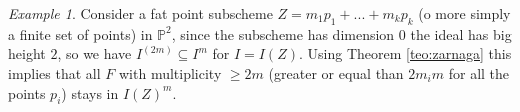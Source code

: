 \documentclass[a4wide]{book}
\theoremstyle{plain}
\theoremstyle{remark}
\newtheorem{ex}[rem]{Example}
\theoremstyle{definition}
\newcommand{\PP}{\mathbb{P}}
\newcommand{\cont}[2]{ I^{(#1)} \subseteq I^{#2}}
\newcounter{que}
\begin{document}
	\begin{ex}\label{es:P2points}
	Consider a %
	fat point subscheme $ Z = m_1 p_1 + ... +  m_k p_k$ (o more simply a finite set of points) in $ \PP^2 $, since the subscheme has dimension $ 0 $ the ideal has big height $ 2 $, so we have $ \cont{2m}{m} $ for $ I = I(Z) $. Using Theorem \ref{teo:zarnaga} this implies that all $ F $ with multiplicity $ \geq 2m $ (greater or equal than $ 2m_im $ for all the points $ p_i $) stays in $ I(Z)^m $. 
	\end{ex}
	
%	
%	
%	 
	
\end{document}
